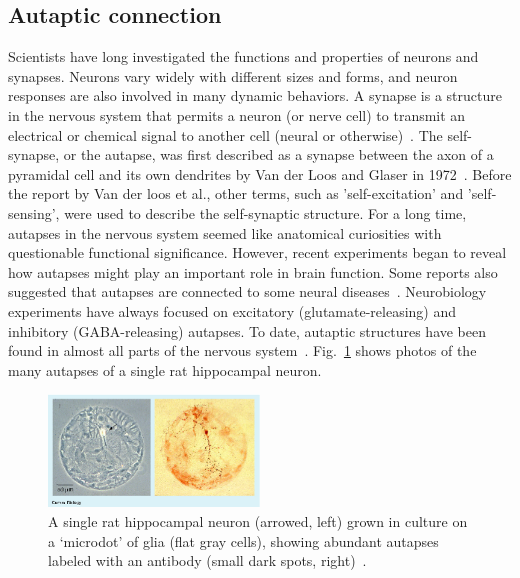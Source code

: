 \documentclass[twocolumn,showpacs,preprintnumbers,amsmath,amssymb,pre,superscriptaddress]{revtex4-1}
\begin{document}
\begin{CJK}{UTF8}{gbsn}
\section{Autaptic connection}

Scientists have long investigated the functions and properties of neurons and synapses. Neurons vary widely with different sizes and forms, and neuron responses are also involved in many dynamic behaviors. A synapse is a structure in the nervous system that permits a neuron (or nerve cell) to transmit an electrical or chemical signal to another cell (neural or otherwise)~\cite{schacter}. The self-synapse, or the autapse, was first described as a synapse between the axon of a pyramidal cell and its own dendrites by Van der Loos and Glaser in 1972~\cite{vander}. Before the report by Van der loos et al., other terms, such as 'self-excitation' and 'self-sensing', were used to describe the self-synaptic structure. For a long time, autapses in the nervous system seemed like anatomical curiosities with questionable functional significance. However, recent experiments began to reveal how autapses might play an important role in brain function. Some reports also suggested that autapses are connected to some neural diseases~\cite{jang}. Neurobiology experiments have always focused on excitatory (glutamate-releasing) and inhibitory (GABA-releasing) autapses. To date, autaptic structures have been found in almost all parts of the nervous system~\cite{Bekkers1998}. Fig.~\ref{autapse2} shows photos of the many autapses of a single rat hippocampal neuron. 

\begin{figure}
\begin{center}
\includegraphics[width=0.5\textwidth]{fig1_autapse.eps}
\end{center}
\caption{A single rat hippocampal neuron (arrowed, left) grown in culture on a ­‘microdot’ of glia (flat gray cells), showing abundant autapses labeled with an antibody (small dark spots, right)~\cite{ikeda}.} 
\label{autapse2}
\end{figure}


\end{CJK}
\end{document}

